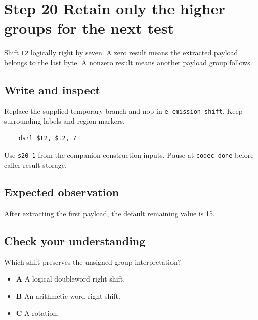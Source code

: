 \section{Step 20 Retain only the higher groups for the next test}\label{delta-s20}

Shift \texttt{t2} logically right by seven. A zero result means the extracted payload belongs to the last byte. A nonzero result means another payload group follows.

\subsection{Write and inspect}
Replace the supplied temporary branch and nop in \texttt{e\_emission\_shift}. Keep surrounding labels and region markers.

\begin{verbatim}
    dsrl $t2, $t2, 7
\end{verbatim}
Use \texttt{s20-1} from the companion construction inputs. Pause at \texttt{codec\_done} before caller result storage.

\subsection{Expected observation}
After extracting the first payload, the default remaining value is 15.

\subsection{Check your understanding}
Which shift preserves the unsigned group interpretation?

\begin{itemize}
  \item \textbf{A} A logical doubleword right shift.
  \item \textbf{B} An arithmetic word right shift.
  \item \textbf{C} A rotation.
\end{itemize}
